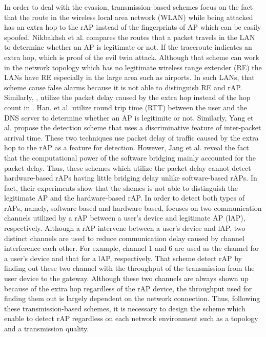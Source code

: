 \documentclass[conference]{IEEEtran}
\begin{document}
In order to deal with the evasion, transmission-based schemes focus on the fact that the route in the wireless local area network (WLAN) while being attacked has an extra hop to the rAP instead of the fingerprints of AP which can be easily spoofed.
Nikbakhsh et al. \cite{traceroute} compares the routes that a packet travels in the LAN to determine whether an AP is legitimate or not.
If the traceroute indicates an extra hop, which is proof of the evil twin attack.
Although that scheme can work in the network topology which has no legitimate wireless range extender (RE) the LANs have RE especially in the large area such as airports.
In such LANs, that scheme cause false alarms because it is not able to distinguish RE and rAP.
Similarly, \cite{rtt}, \cite{iat} utilize the packet delay caused by the extra hop instead of the hop count in \cite{traceroute}.
Han. et al. \cite{rtt} utilize round trip time (RTT) between the user and the DNS server to determine whether an AP is legitimite or not.
Similarly, Yang et al. propose the detection scheme that uses a discriminative feature of inter-packet arrival time.
These two techniques use packet delay of traffic caused by the extra hop to the rAP as a feature for detection.
However, Jang et al. \cite{previous} reveal the fact that the computational power of the software bridging mainly accounted for the packet delay.
Thus, these schemes which utilize the packet delay cannot detect hardware-based rAPs having little bridging delay unlike software-based rAPs.
In fact, their experiments show that the shemes is not able to distinguish the legitimate AP and the hardware-based rAP.
In order to detect both types of rAPs, namely, software-based and hardware-based, \cite{previous} focuses on two communication channels utilized by a rAP between a user's device and legitimate AP (lAP), respectively.
Although a rAP intervene between a user's device and lAP, two distinct channels are used to reduce communication delay caused by channel interference each other.
For example, channel 1 and 6 are used as the channel for a user's device and that for a lAP, respectively.
That scheme detect rAP by finding out these two channel with the throughput of the transmission from the user device to the gateway.
Although these two channels are always shown up because of the extra hop regardless of the rAP device, the throughput used for finding them out is largely dependent on the network connection.
Thus, following these transmission-based schemes, it is necessary to design the scheme which enable to detect rAP regardless on each network environment such as a topology and a transmission quality.
\end{document}
